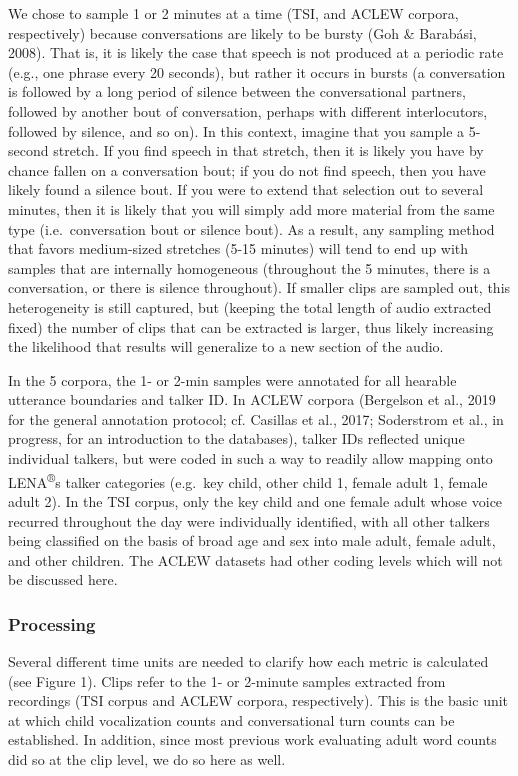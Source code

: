 \documentclass[english,floatsintext,man]{apa6}
\begin{document}
We chose to sample 1 or 2 minutes at a time (TSI, and ACLEW corpora,
respectively) because conversations are likely to be bursty (Goh \&
Barabási, 2008). That is, it is likely the case that speech is not
produced at a periodic rate (e.g., one phrase every 20 seconds), but
rather it occurs in bursts (a conversation is followed by a long period
of silence between the conversational partners, followed by another bout
of conversation, perhaps with different interlocutors, followed by
silence, and so on). In this context, imagine that you sample a 5-second
stretch. If you find speech in that stretch, then it is likely you have
by chance fallen on a conversation bout; if you do not find speech, then
you have likely found a silence bout. If you were to extend that
selection out to several minutes, then it is likely that you will simply
add more material from the same type (i.e.~conversation bout or silence
bout). As a result, any sampling method that favors medium-sized
stretches (5-15 minutes) will tend to end up with samples that are
internally homogeneous (throughout the 5 minutes, there is a
conversation, or there is silence throughout). If smaller clips are
sampled out, this heterogeneity is still captured, but (keeping the
total length of audio extracted fixed) the number of clips that can be
extracted is larger, thus likely increasing the likelihood that results
will generalize to a new section of the audio.

In the 5 corpora, the 1- or 2-min samples were annotated for all
hearable utterance boundaries and talker ID. In ACLEW corpora (Bergelson
et al., 2019 for the general annotation protocol; cf. Casillas et al.,
2017; Soderstrom et al., in progress, for an introduction to the
databases), talker IDs reflected unique individual talkers, but were
coded in such a way to readily allow mapping onto
LENA\textsuperscript{®}s talker categories (e.g.~key child, other child
1, female adult 1, female adult 2). In the TSI corpus, only the key
child and one female adult whose voice recurred throughout the day were
individually identified, with all other talkers being classified on the
basis of broad age and sex into male adult, female adult, and other
children. The ACLEW datasets had other coding levels which will not be
discussed here.

\subsubsection{Processing}\label{processing}

Several different time units are needed to clarify how each metric is
calculated (see Figure 1). Clips refer to the 1- or 2-minute samples
extracted from recordings (TSI corpus and ACLEW corpora, respectively).
This is the basic unit at which child vocalization counts and
conversational turn counts can be established. In addition, since most
previous work evaluating adult word counts did so at the clip level, we
do so here as well.
\end{document}
